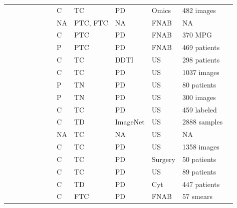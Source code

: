 \documentclass[a4paper,fleqn]{cas-sc}
\newcommand{\cmark}{\ding{51}}%
\begin{document}
\begin{table}[t!]
\begin{tabular}{
m{0.5cm}
m{0.3cm}
m{0.3cm}
m{0.3cm}
m{0.3cm}
m{0.3cm}
m{0.3cm}
m{1.3cm}
m{1.3cm}
m{1.3cm}
m{1.3cm}
m{2.3cm}
m{2.3cm}
}
\cite{thomas2020aibx} & & \cmark & \cmark & & & & C & TC & PD & Omics & 482 images \\

\cite{kezlarian2020artificial} & & \cmark & \cmark & & & & NA & PTC, FTC & NA & FNAB & NA \\ 

\cite{sanyal2018artificial} &  & \cmark & \cmark & & & & C & PTC & PD & FNAB & 370 MPG \\ 

\cite{yoon2020artificial} &  & \cmark & \cmark & & & & P & PTC & PD & FNAB & 469 patients \\ 

\cite{nguyen2020ultrasound} & & \cmark & \cmark & & & & C & TC & DDTI & US & 298 patients \\ 

\cite{liu2017classification} &  & \cmark & \cmark & & & & C & TC & PD & US & 1037 images \\ 

\cite{abdolali2020automated} &  & \cmark & \cmark & & & & P & TN & PD & US & 80 patients \\ 

\cite{li2018fully} &  & \cmark & \cmark & & & & P & TN & PD & US & 300 images \\ 

\cite{kim2016deep} &  & \cmark & \cmark & & & & C & TC & PD & US & 459 labeled \\ 

\cite{ma2019thyroid} & & \cmark & \cmark & & & & C & TD & ImageNet & US & 2888 samples  \\ 

\cite{chai2020artificial} &  & \cmark & & & & \cmark & NA & TC & NA & US & NA \\ 

\cite{song2019ultrasound} &  & \cmark & & & & \cmark & C & TC & PD & US & 1358 images \\ 

\cite{barczynski2020clinical} & \cmark & & & & & \cmark & C & TC & PD & Surgery & 50 patients \\ 

\cite{choi2017computer} & \cmark & & & & & \cmark & C & TC & PD & US & 89 patients \\ 

\cite{fragopoulos2020radial} & \cmark & & & & & \cmark & C & TD & PD & Cyt & 447 patients \\ 

\cite{savala2018artificial} & \cmark & \cmark & & & & \cmark & C & FTC & PD & FNAB & 57 smears \\ 


\end{tabular}
\end{table}
\end{document}
